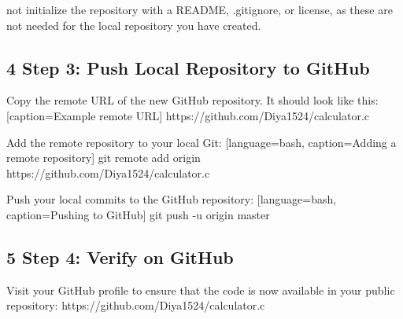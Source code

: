 \documentclass{article} %
\begin{document}
\noindent not initialize the repository with a README, .gitignore, or license, as these are not needed for the local repository you have created.

\noindent 

\noindent 
\subsection{4 Step 3:  Push Local Repository to GitHub}

\noindent Copy the remote URL of the new GitHub repository. It should look like this: [caption=Example remote URL] https://github.com/Diya1524/calculator.c

\noindent Add the remote repository to your local Git: [language=bash, caption=Adding a remote repository] git remote add origin https://github.com/Diya1524/calculator.c

\noindent Push your local commits to the GitHub repository: [language=bash, caption=Pushing to GitHub] git push -u origin master

\noindent 

\noindent 
\subsection{5 Step 4:  Verify on GitHub}

\noindent Visit your GitHub profile to ensure that the code is now available in your public repository:  https://github.com/Diya1524/calculator.c

\noindent 

\noindent 

\noindent 

\noindent 

\noindent 

\noindent 

\noindent 

\noindent 

\noindent 

\noindent 

\noindent 

\noindent 

\noindent 

\noindent 

\noindent 

\noindent 

\noindent 

\noindent 

\noindent 

\noindent 
\end{document}
